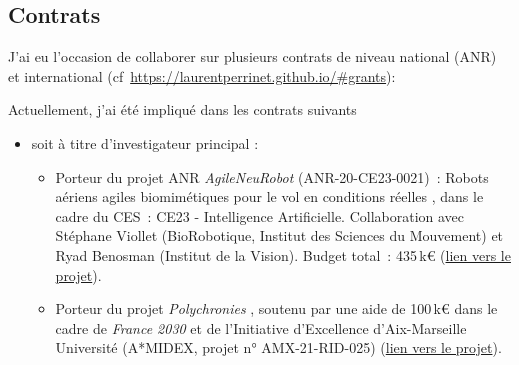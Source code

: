 \documentclass[10pt,french,a4paper,oneside]{article}%
\begin{document}
\subsection{Contrats} %
J'ai eu l'occasion de collaborer sur plusieurs contrats de niveau national (ANR) et international (cf~\url{https://laurentperrinet.github.io/#grants}):


Actuellement, j'ai été impliqué dans les contrats suivants
\begin{itemize}
\item soit à titre d'investigateur principal :
\begin{itemize}

	\item Porteur du projet ANR \og \textit{AgileNeuRobot} \fg{} (ANR-20-CE23-0021)~: \og Robots aériens agiles biomimétiques pour le vol en conditions réelles \fg{}, dans le cadre du CES~: CE23 - Intelligence Artificielle. Collaboration avec Stéphane Viollet (BioRobotique, Institut des Sciences du Mouvement) et Ryad Benosman (Institut de la Vision). Budget total~: 435\,k€ (\href{https://laurentperrinet.github.io/grant/anr-anr/}{lien vers le projet}).

	\item Porteur du projet \og \textit{Polychronies} \fg{}, soutenu par une aide de 100\,k€ dans le cadre de \textit{France 2030} et de l’Initiative d’Excellence d’Aix-Marseille Université (A*MIDEX, projet n° AMX-21-RID-025) (\href{https://laurentperrinet.github.io/grant/polychronies/}{lien vers le projet}).
\end{itemize}


\end{itemize}
\end{document}
